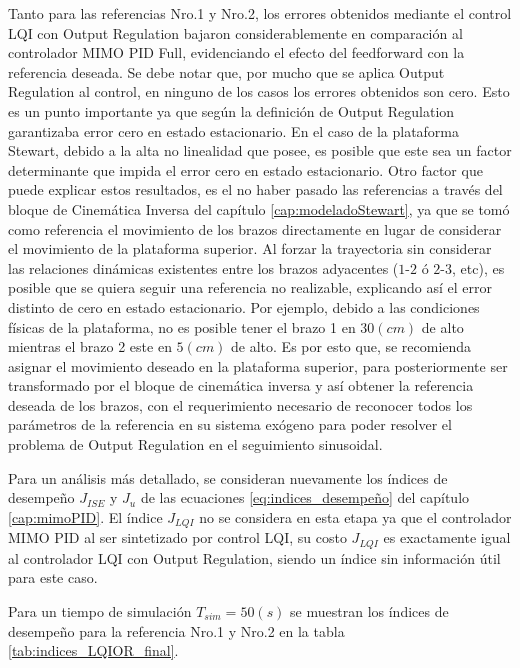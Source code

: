 Tanto para las referencias Nro.1 y Nro.2, los errores obtenidos mediante el control LQI con Output Regulation bajaron considerablemente en comparación al controlador MIMO PID Full, evidenciando el efecto del feedforward con la referencia deseada. Se debe notar que, por mucho que se aplica Output Regulation al control, en ninguno de los casos los errores obtenidos son cero. Esto es un punto importante ya que según la definición de Output Regulation garantizaba error cero en estado estacionario. En el caso de la plataforma Stewart, debido a la alta no linealidad que posee, es posible que este sea un factor determinante que impida el error cero en estado estacionario. Otro factor que puede explicar estos resultados, es el no haber pasado las referencias a través del bloque de Cinemática Inversa del capítulo \ref{cap:modeladoStewart}, ya que se tomó como referencia el movimiento de los brazos directamente en lugar de considerar el movimiento de la plataforma superior. Al forzar la trayectoria sin considerar las relaciones dinámicas existentes entre los brazos adyacentes ($1$-$2$ ó $2$-$3$, etc), es posible que se quiera seguir una referencia no realizable, explicando así el error distinto de cero en estado estacionario. Por ejemplo, debido a las condiciones físicas de la plataforma, no es posible tener el brazo 1 en $30(cm)$ de alto mientras el brazo 2 este en $5(cm)$ de alto. Es por esto que, se recomienda asignar el movimiento deseado en la plataforma superior, para posteriormente ser transformado por el bloque de cinemática inversa y así obtener la referencia deseada de los brazos, con el requerimiento necesario de reconocer todos los parámetros de la referencia en su sistema exógeno para poder resolver el problema de Output Regulation en el seguimiento sinusoidal.

Para un análisis más detallado, se consideran nuevamente los índices de desempeño $J_{ISE}$ y $J_u$ de las ecuaciones \ref{eq:indices_desempeño} del capítulo \ref{cap:mimoPID}. El índice $J_{LQI}$ no se considera en esta etapa ya que el controlador MIMO PID al ser sintetizado por control LQI, su costo $J_{LQI}$ es exactamente igual al controlador LQI con Output Regulation, siendo un índice sin información útil para este caso. 

Para un tiempo de simulación $T_{sim}=50(s)$ se muestran los índices de desempeño para la referencia Nro.1 y Nro.2 en la tabla \ref{tab:indices_LQIOR_final}.

